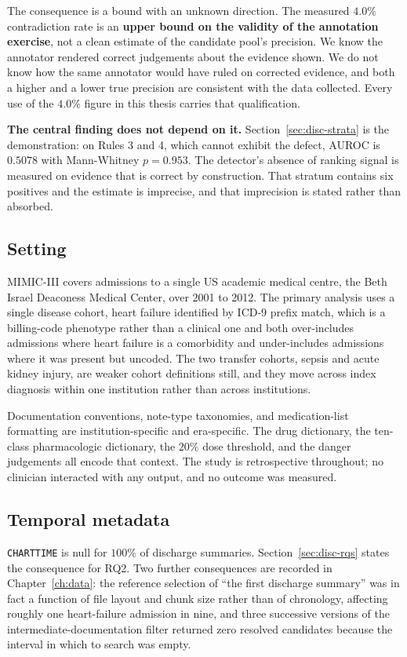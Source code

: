 The consequence is a bound with an unknown direction. The measured $4.0\%$
contradiction rate is an \textbf{upper bound on the validity of the annotation
exercise}, not a clean estimate of the candidate pool's precision. We know the
annotator rendered correct judgements about the evidence shown. We do not know
how the same annotator would have ruled on corrected evidence, and both a higher
and a lower true precision are consistent with the data collected. Every use of
the $4.0\%$ figure in this thesis carries that qualification.

\textbf{The central finding does not depend on it.}
Section~\ref{sec:disc-strata} is the demonstration: on Rules 3 and 4, which
cannot exhibit the defect, AUROC is $0.5078$ with Mann-Whitney $p = 0.953$. The
detector's absence of ranking signal is measured on evidence that is correct by
construction. That stratum contains six positives and the estimate is imprecise,
and that imprecision is stated rather than absorbed.

\subsection{Setting}

MIMIC-III covers admissions to a single US academic medical centre, the Beth
Israel Deaconess Medical Center, over 2001 to 2012. The primary analysis uses a
single disease cohort, heart failure identified by ICD-9 prefix match, which is
a billing-code phenotype rather than a clinical one and both over-includes
admissions where heart failure is a comorbidity and under-includes admissions
where it was present but uncoded. The two transfer cohorts, sepsis and acute
kidney injury, are weaker cohort definitions still, and they move across index
diagnosis within one institution rather than across institutions.

Documentation conventions, note-type taxonomies, and medication-list formatting
are institution-specific and era-specific. The drug dictionary, the ten-class
pharmacologic dictionary, the $20\%$ dose threshold, and the danger judgements
all encode that context. The study is retrospective throughout; no clinician
interacted with any output, and no outcome was measured.

\subsection{Temporal metadata}

\texttt{CHARTTIME} is null for $100\%$ of discharge summaries.
Section~\ref{sec:disc-rqs} states the consequence for RQ2. Two further
consequences are recorded in Chapter~\ref{ch:data}: the reference selection of
``the first discharge summary'' was in fact a function of file layout and chunk
size rather than of chronology, affecting roughly one heart-failure admission in
nine, and three successive versions of the intermediate-documentation filter
returned zero resolved candidates because the interval in which to search was
empty.

